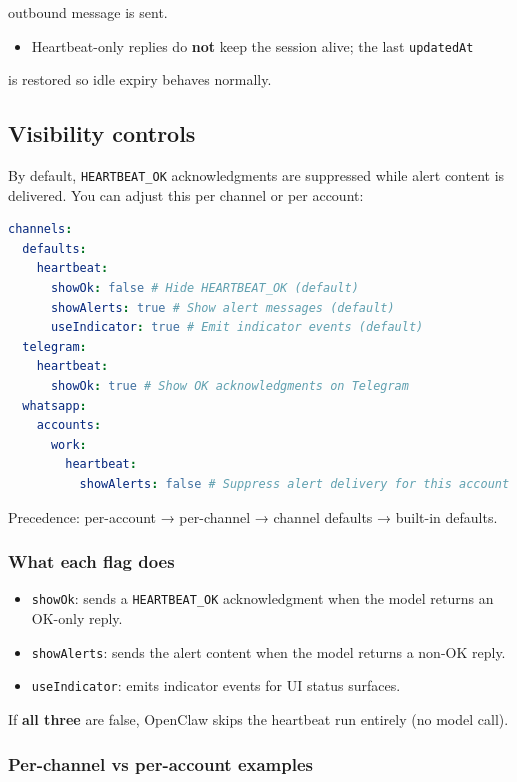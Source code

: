 outbound message is sent.
\begin{itemize}
  \item Heartbeat-only replies do \textbf{not} keep the session alive; the last \texttt{updatedAt}
\end{itemize}

is restored so idle expiry behaves normally.

\subsection{Visibility controls}


By default, \texttt{HEARTBEAT\_OK} acknowledgments are suppressed while alert content is
delivered. You can adjust this per channel or per account:

\begin{lstlisting}[language=yaml]
channels:
  defaults:
    heartbeat:
      showOk: false # Hide HEARTBEAT_OK (default)
      showAlerts: true # Show alert messages (default)
      useIndicator: true # Emit indicator events (default)
  telegram:
    heartbeat:
      showOk: true # Show OK acknowledgments on Telegram
  whatsapp:
    accounts:
      work:
        heartbeat:
          showAlerts: false # Suppress alert delivery for this account
\end{lstlisting}


Precedence: per-account → per-channel → channel defaults → built-in defaults.

\subsubsection{What each flag does}


\begin{itemize}
  \item \texttt{showOk}: sends a \texttt{HEARTBEAT\_OK} acknowledgment when the model returns an OK-only reply.
  \item \texttt{showAlerts}: sends the alert content when the model returns a non-OK reply.
  \item \texttt{useIndicator}: emits indicator events for UI status surfaces.
\end{itemize}


If \textbf{all three} are false, OpenClaw skips the heartbeat run entirely (no model call).

\subsubsection{Per-channel vs per-account examples}



